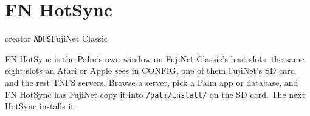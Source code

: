 
\newpage
\section{FN HotSync}\label{app:fnhotsync}
  {\fnbadge\quad creator \texttt{ADHS}\quad FujiNet Classic}

FN HotSync is the Palm's own window on FujiNet Classic's host slots: the
same eight slots an Atari or Apple sees in CONFIG, one of them FujiNet's SD
card and the rest TNFS servers. Browse a server, pick a Palm app or database,
and FN HotSync has FujiNet copy it into \texttt{/palm/install/} on the SD card.
The next HotSync installs it.

\begin{center}
\hfill
{}\hfill
{}
\end{center}

